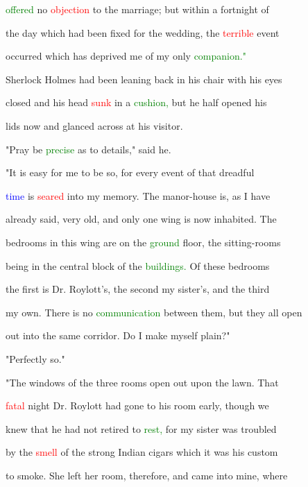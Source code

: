  \textcolor{green}{offered} no \textcolor{red}{objection} to the \textcolor{BurntOrange}{marriage;} but within a fortnight of

 the day which had been fixed for the wedding, the \textcolor{red}{terrible} event

 occurred which has deprived me of my only \textcolor{green}{companion."}



 Sherlock Holmes had been leaning back in his chair with his eyes

 closed and his head \textcolor{red}{sunk} in a \textcolor{green}{cushion,} but he half opened his

 lids now and glanced across at his \textcolor{BurntOrange}{visitor.}



 \textcolor{BurntOrange}{"Pray} be \textcolor{green}{precise} as to details," said he.



 "It is easy for me to be so, for every event of that \textcolor{BurntOrange}{dreadful}

 \textcolor{blue}{time} is \textcolor{red}{seared} into my memory. The manor-house is, as I have

 already said, very old, and only one wing is now inhabited. The

 bedrooms in this wing are on the \textcolor{green}{ground} floor, the sitting-rooms

 being in the central block of the \textcolor{green}{buildings.} Of these bedrooms

 the first is Dr. Roylott's, the second my sister's, and the third

 my own. There is no \textcolor{green}{communication} between them, but they all open

 out into the same corridor. Do I make myself plain?"



 "Perfectly so."



 "The windows of the three rooms open out upon the lawn. That

 \textcolor{red}{fatal} night Dr. Roylott had gone to his room early, though we

 knew that he had not retired to \textcolor{green}{rest,} for my sister was troubled

 by the \textcolor{red}{smell} of the strong Indian cigars which it was his custom

 to smoke. She left her room, therefore, and came into mine, where

